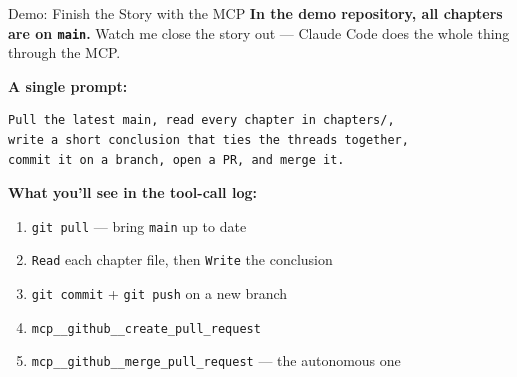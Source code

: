 \documentclass[aspectratio=169, 11pt]{beamer}
\begin{document}
\begin{frame}[fragile]{Demo: Finish the Story with the MCP}
  \textbf{In the demo repository, all chapters are on \texttt{main}.} Watch me close the story out --- Claude Code does the whole thing through the MCP.

  \vspace{0.4em}
  \textbf{A single prompt:}
  \begin{lstlisting}[basicstyle=\ttfamily\scriptsize]
Pull the latest main, read every chapter in chapters/,
write a short conclusion that ties the threads together,
commit it on a branch, open a PR, and merge it.
  \end{lstlisting}

  \vspace{0.4em}
  \textbf{What you'll see in the tool-call log:}
  \begin{enumerate}\small
    \item \texttt{git pull} --- bring \texttt{main} up to date
    \item \texttt{Read} each chapter file, then \texttt{Write} the conclusion
    \item \texttt{git commit} + \texttt{git push} on a new branch
    \item \texttt{mcp\_\_github\_\_create\_pull\_request}
    \item \texttt{mcp\_\_github\_\_merge\_pull\_request} \alert{--- the autonomous one}
  \end{enumerate}
\end{frame}
\end{document}
